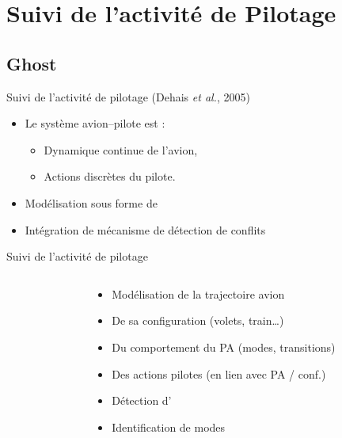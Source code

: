 \documentclass[compress]{beamer}
\begin{document}
\section{Suivi de  l'activité de Pilotage}
\subsection{Ghost}
\begin{frame}{Suivi de l'activité de pilotage (Dehais {\it et al.}, 2005)}
\begin{itemize}
\item Le système avion--pilote est  :
	\begin{itemize}
	\item Dynamique continue de l'avion,
	\item Actions discrètes du pilote.
	\end{itemize}
\item Modélisation sous forme de 
\item Intégration de mécanisme de détection de conflits
\end{itemize}
\end{frame}

\begin{frame}{Suivi de l'activité de pilotage}
\begin{columns}
\begin{column}{0.4\linewidth}
	\begin{tikzpicture}[scale=0.8, transform shape, node distance=35pt]
	
	\end{tikzpicture}
\end{column}
\begin{column}{0.6\linewidth}
\begin{itemize}
\item Modélisation de la trajectoire avion
\item De sa configuration (volets, train\dots)
\item Du comportement du PA (modes, transitions)
\item Des actions pilotes (en lien avec PA / conf.)
\end{itemize}
\vspace{1cm}
\begin{itemize}
\item Détection d'
\item Identification de modes 
\end{itemize}
\end{column}
\end{columns}
\end{frame}
\end{document}

